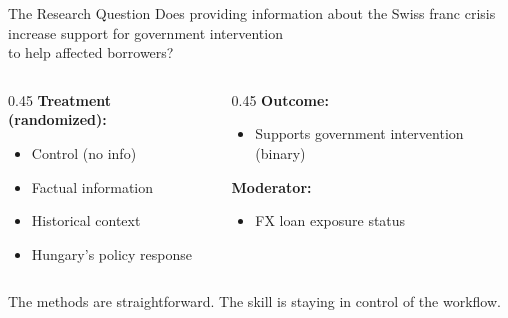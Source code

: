 \documentclass[aspectratio=169, 11pt]{beamer}
\begin{document}
\begin{frame}{The Research Question}
  \centering
  \vspace{1em}
  {\Large Does providing information about the Swiss franc crisis}\\[0.3em]
  {\Large increase support for government intervention}\\[0.3em]
  {\Large to help affected borrowers?}

  \vspace{1.5em}
  \begin{columns}[T]
    \begin{column}{0.45\textwidth}
      \textbf{Treatment (randomized):}
      \begin{itemize}
        \item Control (no info)
        \item Factual information
        \item Historical context
        \item Hungary's policy response
      \end{itemize}
    \end{column}
    \begin{column}{0.45\textwidth}
      \textbf{Outcome:}
      \begin{itemize}
        \item Supports government intervention (binary)
      \end{itemize}
      \vspace{0.5em}
      \textbf{Moderator:}
      \begin{itemize}
        \item FX loan exposure status
      \end{itemize}
    \end{column}
  \end{columns}

  \vspace{1em}
  The methods are straightforward. The skill is staying in control of the workflow.
\end{frame}

\end{document}
